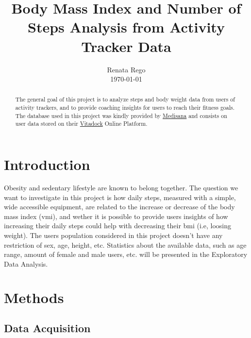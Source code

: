 \documentclass[12pt]{iopart}
\begin{document}
\title[Renata Rego]{Body Mass Index and Number of Steps Analysis from Activity Tracker Data}

\author{Renata Rego \\ \today} %

\begin{abstract}
The general goal of this project is to analyze steps and body weight data from users of activity trackers, and to provide coaching insights for users to reach their fitness goals.
The database used in this project was kindly provided by \href{http://www.medisana.de/}{Medisana\textregistered} and consists on user data stored on their 
\href{https://cloud.vitadock.com/}{Vitadock} Online Platform.

\end{abstract}

\section{Introduction}

Obesity and sedentary lifestyle are known to belong together. The question we want to  investigate in this project is how daily steps, measured with a simple, wide accessible equipment, are related to the increase or decrease of the body mass index (vmi), and wether it is possible to provide users insights of how increasing their daily steps could help with decreasing their bmi (i.e, loosing weight). The users population considered in this project doesn't have any restriction of  sex, age, height, etc. Statistics about the available data, such as age range, amount of female and male users, etc. will be presented in the Exploratory Data Analysis.

\section{Methods}

\subsection{Data Acquisition}
\end{document}
